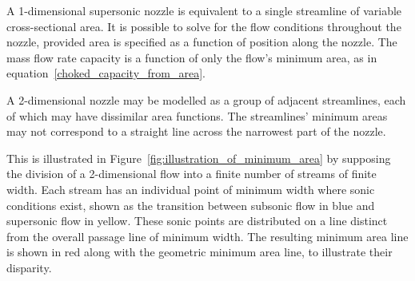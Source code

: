 \documentclass[a4paper, 11pt, twoside]{report}
\begin{document}




A 1-dimensional supersonic nozzle is equivalent to a single streamline of variable cross-sectional area. It is possible to solve for the flow conditions throughout the nozzle, provided area is specified as a function of position along the nozzle. The mass flow rate capacity is a function of only the flow's minimum area, as in equation~\ref{choked_capacity_from_area}.

A 2-dimensional nozzle may be modelled as a group of adjacent streamlines, each of which may have dissimilar area functions. The streamlines' minimum areas may not correspond to a straight line across the narrowest part of the nozzle. 

This is illustrated in Figure~\ref{fig:illustration_of_minimum_area} by supposing the division of a 2-dimensional flow into a finite number of streams of finite width. Each stream has an individual point of minimum width where sonic conditions exist, shown as the transition between subsonic flow in blue and supersonic flow in yellow. These sonic points are distributed on a line distinct from the overall passage line of minimum width. The resulting minimum area line is shown in red along with the geometric minimum area line, to illustrate their disparity.
\end{document}
